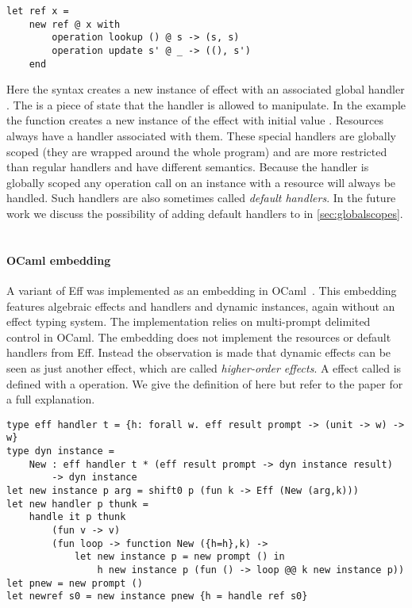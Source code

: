 \begin{verbatim}
let ref x =
	new ref @ x with
		operation lookup () @ s -> (s, s)
		operation update s' @ _ -> ((), s')
	end
\end{verbatim}
Here the  syntax creates a new instance of effect  with an associated global handler .
The  is a piece of state that the handler is allowed to manipulate.
In the example the  function creates a new instance of the  effect with initial value .
Resources always have a handler associated with them.
These special handlers are globally scoped (they are wrapped around the whole program) and are more restricted than regular handlers and have different semantics.
Because the handler is globally scoped any operation call on an instance with a resource will always be handled.
Such handlers are also sometimes called \emph{default handlers}.
In the future work we discuss the possibility of adding default handlers to \lang{} in \cref{sec:globalscopes}.
\\\\
\pagebreak
\paragraph{OCaml embedding}
A variant of Eff was implemented as an embedding in OCaml~\autocite{effdirectly}.
This embedding features algebraic effects and handlers and dynamic instances, again without an effect typing system.
The implementation relies on multi-prompt delimited control in OCaml.
The embedding does not implement the resources or default handlers from Eff.
Instead the observation is made that dynamic effects can be seen as just another effect, which are called \emph{higher-order effects}.
A effect called  is defined with a  operation.
We give the definition of  here but refer to the paper for a full explanation.

\begin{verbatim}
type eff handler t = {h: forall w. eff result prompt -> (unit -> w) -> w}
type dyn instance =
	New : eff handler t * (eff result prompt -> dyn instance result)
		-> dyn instance
let new instance p arg = shift0 p (fun k -> Eff (New (arg,k)))
let new handler p thunk =
	handle it p thunk
		(fun v -> v)
		(fun loop -> function New ({h=h},k) ->
			let new instance p = new prompt () in
				h new instance p (fun () -> loop @@ k new instance p))
let pnew = new prompt ()
let newref s0 = new instance pnew {h = handle ref s0}
\end{verbatim}

